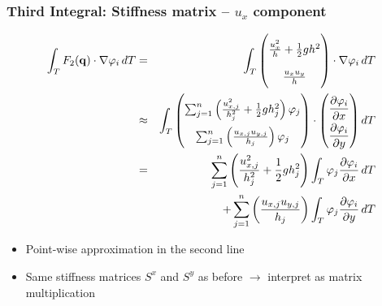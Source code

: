 \documentclass{beamer}
\newcommand{\pd}[2]{\dfrac{\partial #1}{\partial #2}}
\renewcommand{\phi}{\varphi}
\begin{document}
\begin{frame}
  \frametitle{Third Integral: Stiffness matrix -- $u_x$ component}
  \begin{eqnarray*}
    \label{sec:third-integral-second-line-1}
    \int_T F_2(\mathbf{q}) \cdot \nabla \phi_i \, dT & = &
    \int_T
    \begin{pmatrix}
      \frac{u_x^2}{h} + \frac{1}{2} g h^2 \\ \frac{u_x u_y}{h}
    \end{pmatrix}
    \cdot \nabla \phi_i \, dT \\
    \label{sec:third-integral-second-line-2}
    & \approx &
    \int_T
    \begin{pmatrix}
      \sum_{j=1}^n \left(\frac{u_{x,j}^2}{h_j^2} + \frac{1}{2} g h_j^2\right) \phi_j \\
      \sum_{j=1}^n \left(\frac{u_{x,j} u_{y,j}}{h_j}\right) \phi_j \\
    \end{pmatrix}
    \cdot
    {
      \renewcommand{\arraystretch}{2}
      \begin{pmatrix}
        \pd{\phi_i}{x} \\
        \pd{\phi_i}{y}
      \end{pmatrix} dT
    } \\
    & = & \nonumber \sum_{j=1}^n \left(\frac{u_{x,j}^2}{h_j^2} + \frac{1}{2} g h_j^2\right) \int_T \phi_j \pd{\phi_i}{x} \, dT \\
    & {} & + \nonumber \sum_{j=1}^n \left(\frac{u_{x,j} u_{y,j}}{h_j}\right) \int_T \phi_j \pd{\phi_i}{y} \, dT
  \end{eqnarray*}
  \begin{itemize}
  \item Point-wise approximation in the second line
  \item Same stiffness matrices $S^x$ and $S^y$ as before $\rightarrow$ interpret as matrix multiplication
  \end{itemize}
\end{frame}
\end{document}
